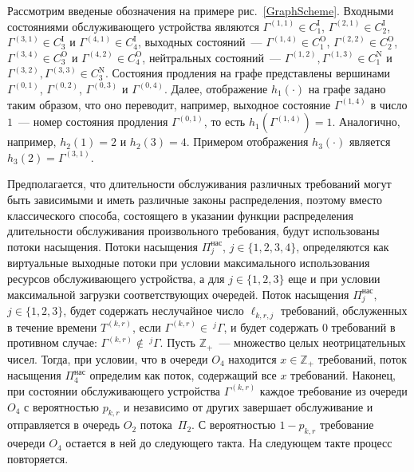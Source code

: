 \documentclass[a4paper,12pt,russian]{extarticle}
\begin{document}
Рассмотрим введеные обозначения на примере рис.~\ref{GraphScheme}. Входными состояниями обслуживающего устройства 	являются $\Gamma^{(1,1)} \in C_1^{\mathrm{I}}$, $\Gamma^{(2,1)} \in C_2^{\mathrm{I}}$, $\Gamma^{(3,1)} \in C_3^{\mathrm{I}}$ и $\Gamma^{(4,1)} \in C_4^{\mathrm{I}}$, выходных состояний~--- $\Gamma^{(1,4)} \in C_1^{\mathrm{O}}$, $\Gamma^{(2,2)} \in C_2^{\mathrm{O}}$, $\Gamma^{(3,4)} \in C_3^{\mathrm{O}}$ и $\Gamma^{(4,2)} \in C_4^{\mathrm{O}}$, нейтральных состояний~--- $\Gamma^{(1,2)}, \Gamma^{(1,3)} \in C_1^{\mathrm{N}}$ и $\Gamma^{(3,2)}, \Gamma^{(3,3)} \in C_3^{\mathrm{N}}$. Состояния продления на графе представлены вершинами $\Gamma^{(0,1)}$, $\Gamma^{(0,2)}$, $\Gamma^{(0,3)}$ и $\Gamma^{(0,4)}$. Далее, отображение $h_1(\cdot)$ на графе задано таким образом, что оно переводит, например, выходное состояние $\Gamma^{(1,4)}$ в число $1$~--- номер состояния продления $\Gamma^{(0,1)}$, то есть $h_1(\Gamma^{(1,4)})=1$. Аналогично, например, $h_2(1)=2$ и $h_2(3)=4$. Примером отображения $h_3(\cdot)$ является $h_3(2)=\Gamma^{(3,1)}$.


Предполагается, что длительности обслуживания различных требований могут быть зависимыми и иметь различные законы распределения, поэтому вместо классического способа, состоящего в указании функции распределения длительности обслуживания произвольного требования, будут использованы потоки насыщения. Потоки насыщения $\Pi^{\mathrm{\text{нас}}}_j$, $j \in \{1,2,3,4\}$, определяются как виртуальные выходные потоки при 
условии максимального использования ресурсов обслуживающего устройства, а для $j\in \{1, 2, 3\}$ еще и при условии максимальной загрузки соответствующих очередей. Поток насыщения $\Pi^{\mathrm{\text{нас}}}_j$, $j\in \{1,2,3\}$, будет содержать неслучайное число $\ell_{k,r,j}$ требований, обслуженных в течение времени $T^{(k,r)}$, если $\Gamma^{(k,r)} \in~^j\Gamma$, и будет содержать $0$ требований в противном случае: $\Gamma^{(k,r)} \notin ~^j\Gamma$. Пусть $\mathbb{Z}_+$~--- множество целых неотрицательных чисел. Тогда, при условии, что в очереди $O_4$ находится $x \in \mathbb{Z}_+$ требований, поток насыщения $\Pi^{\mathrm{\text{нас}}}_4$ определим как поток, содержащий все $x$ требований.
Наконец, при состоянии обслуживающего устройства $\Gamma^{(k,r)}$ каждое требование из очереди $O_4$ с вероятностью $p_{k,r}$ и независимо от других завершает обслуживание и отправляется в очередь $O_2$ потока~$\Pi_2$. С вероятностью $1-p_{k,r}$ требование очереди $O_4$ остается в ней до следующего такта. На следующем такте процесс повторяется.
\end{document}
